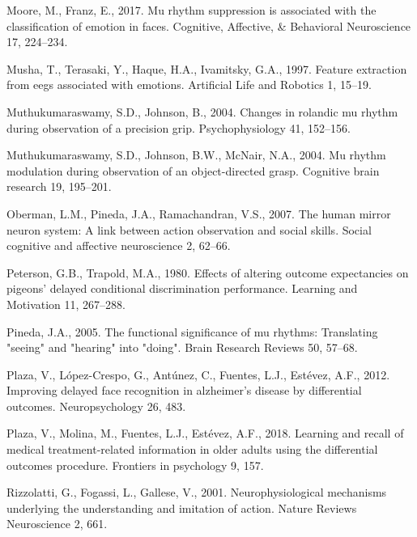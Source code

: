 \documentclass[]{elsarticle} %
\begin{document}
\leavevmode\hypertarget{ref-MooreMatthew2017Mrsi}{}%
Moore, M., Franz, E., 2017. Mu rhythm suppression is associated with the
classification of emotion in faces. Cognitive, Affective, \& Behavioral
Neuroscience 17, 224--234.

\leavevmode\hypertarget{ref-musha1997feature}{}%
Musha, T., Terasaki, Y., Haque, H.A., Ivamitsky, G.A., 1997. Feature
extraction from eegs associated with emotions. Artificial Life and
Robotics 1, 15--19.

\leavevmode\hypertarget{ref-muthukumaraswamy2004changes}{}%
Muthukumaraswamy, S.D., Johnson, B., 2004. Changes in rolandic mu rhythm
during observation of a precision grip. Psychophysiology 41, 152--156.

\leavevmode\hypertarget{ref-muthukumaraswamy2004mu}{}%
Muthukumaraswamy, S.D., Johnson, B.W., McNair, N.A., 2004. Mu rhythm
modulation during observation of an object-directed grasp. Cognitive
brain research 19, 195--201.

\leavevmode\hypertarget{ref-oberman2007human}{}%
Oberman, L.M., Pineda, J.A., Ramachandran, V.S., 2007. The human mirror
neuron system: A link between action observation and social skills.
Social cognitive and affective neuroscience 2, 62--66.

\leavevmode\hypertarget{ref-peterson1980effects}{}%
Peterson, G.B., Trapold, M.A., 1980. Effects of altering outcome
expectancies on pigeons' delayed conditional discrimination performance.
Learning and Motivation 11, 267--288.

\leavevmode\hypertarget{ref-PinedaJaimeA2005Tfso}{}%
Pineda, J.A., 2005. The functional significance of mu rhythms:
Translating "seeing" and "hearing" into "doing". Brain Research Reviews
50, 57--68.

\leavevmode\hypertarget{ref-plaza2012improving}{}%
Plaza, V., López-Crespo, G., Antúnez, C., Fuentes, L.J., Estévez, A.F.,
2012. Improving delayed face recognition in alzheimer's disease by
differential outcomes. Neuropsychology 26, 483.

\leavevmode\hypertarget{ref-plaza2018learning}{}%
Plaza, V., Molina, M., Fuentes, L.J., Estévez, A.F., 2018. Learning and
recall of medical treatment-related information in older adults using
the differential outcomes procedure. Frontiers in psychology 9, 157.

\leavevmode\hypertarget{ref-GiacomoRizzolatti2001Nmut}{}%
Rizzolatti, G., Fogassi, L., Gallese, V., 2001. Neurophysiological
mechanisms underlying the understanding and imitation of action. Nature
Reviews Neuroscience 2, 661.
\end{document}

